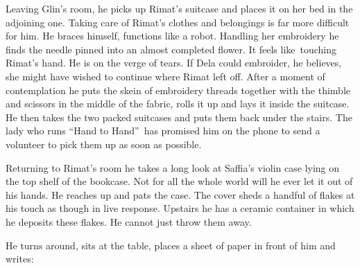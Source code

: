 \documentclass[twoside,11pt]{book}
\begin{document}
Leaving Glin's room, he picks up Rimat's suitcase and places it on her bed in the adjoining one. Taking care of Rimat's
clothes and belongings is far more difficult for him. He braces himself, functions like a robot. Handling
her embroidery he finds the needle pinned into an almost completed flower. It feels like~touching Rimat's hand. He is
on the verge of tears{.}  If Dela could embroider, he believes, she might
have wished to continue where Rimat left off. After a moment of contemplation he puts the skein
of embroidery  threads together with the thimble and scissors in the middle of the fabric, rolls it up and lays it
inside the suitcase. He then takes the two packed suitcases and puts them back under the stairs. The lady who runs
``Hand to Hand''~has promised him on the phone to send a volunteer to pick them up as soon as
possible.

Returning to Rimat's room he takes a long look at Saffia's violin case lying on the top shelf of the bookcase. Not for
all{ }the whole world will he ever let it out of his hands. He reaches up and
pats the case. The cover sheds a handful of flakes at his touch as though in live response. Upstairs he has a ceramic
container in which he deposits these flakes. He cannot just throw them away.

He turns around, sits at the table, places a sheet of paper in front of him and writes:
\end{document}

